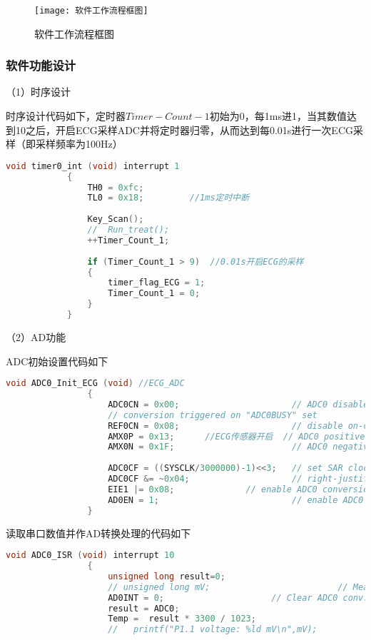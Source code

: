 \documentclass{zjureport}
\begin{document}
	\begin{figure}[H]
		\centering%
		\texttt{[image: 软件工作流程框图]}
		\caption{软件工作流程框图}%
		\label{软件工作流程框图}%
	\end{figure}
	
	\subsubsection{软件功能设计}
	
	（1）时序设计  
	    
	    时序设计代码如下，定时器$Timer-Count-1$初始为0，每1ms进1，当其数值达到10之后，开启ECG采样ADC并将定时器归零，从而达到每0.01s进行一次ECG采样（即采样频率为100Hz）
	    
	    \begin{lstlisting}[language=C]
	    	void timer0_int (void) interrupt 1
	    	{
	    		TH0 = 0xfc;
	    		TL0 = 0x18;			//1ms定时中断
	    		
	    		Key_Scan();
	    		//	Run_treat();
	    		++Timer_Count_1;
	    		
	    		if (Timer_Count_1 > 9)  //0.01s开启ECG的采样
	    		{
	    			timer_flag_ECG = 1;
	    			Timer_Count_1 = 0;
	    		}
	    	}
	    \end{lstlisting}
	    
	（2）AD功能                   
	        
	        ADC初始设置代码如下 
	         \begin{lstlisting}[language=C]
	         	void ADC0_Init_ECG (void) //ECG_ADC
	         	{
	         		ADC0CN = 0x00;                      // ADC0 disabled, normal tracking, 
	         		// conversion triggered on "ADC0BUSY" set
	         		REF0CN = 0x08;                      // disable on-chip VREF and buffer
	         		AMX0P = 0x13;      //ECG传感器开启  // ADC0 positive input = P1.1 
	         		AMX0N = 0x1F;                       // ADC0 negative input = GND
	         		
	         		ADC0CF = ((SYSCLK/3000000)-1)<<3;   // set SAR clock to 3MHz
	         		ADC0CF &= ~0x04;                    // right-justify results 
	         		EIE1 |= 0x08;              // enable ADC0 conversion complete int.
	         		AD0EN = 1;                          // enable ADC0
	         	}
	         \end{lstlisting}
	         
	         读取串口数值并作AD转换处理的代码如下
	          \begin{lstlisting}[language=C]
	         	void ADC0_ISR (void) interrupt 10
	         	{
	         		unsigned long result=0;
	         		// unsigned long mV;                         // Measured voltage in mV
	         		AD0INT = 0;                     // Clear ADC0 conv. complete flag
	         		result = ADC0;
	         		Temp =  result * 3300 / 1023;   
	         		//   printf("P1.1 voltage: %ld mV\n",mV);
	         \end{lstlisting}
	              
\end{document}
